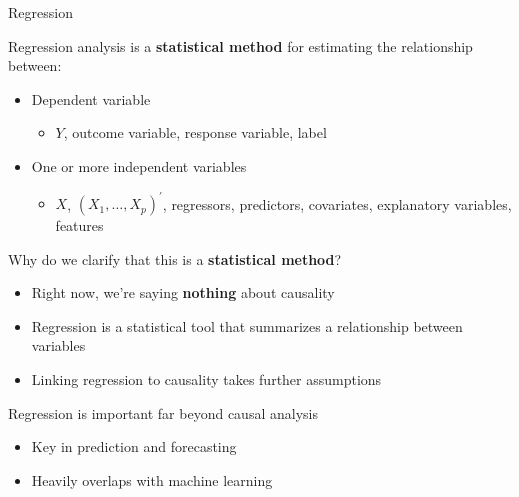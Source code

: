 \documentclass[compress, 8pt]{beamer}
\begin{document}
\begin{frame}{Regression}

    Regression analysis is a \alert<2->{\textbf{statistical method}} for estimating the relationship between:
    \begin{itemize}
        \item Dependent variable
        \begin{itemize}
            \item $Y$, outcome variable, response variable, label
        \end{itemize}
        \item One or more independent variables 
        \begin{itemize}
            \item $X$, $(X_1, \dots, X_p)^\prime$, regressors, predictors, covariates, explanatory variables, features
        \end{itemize}
    \end{itemize}

    \vspace{2ex}
    \pause
    Why do we clarify that this is a \alert<2->{\textbf{statistical method}}?
    \begin{itemize}
        \item Right now, we're saying \textbf{nothing} about causality
        \item Regression is a statistical tool that summarizes a relationship between variables
        \item Linking regression to causality takes further assumptions 
    \end{itemize}

    \vspace{2ex}
    Regression is important far beyond causal analysis
    \begin{itemize}
        \item Key in prediction and forecasting
        \item Heavily overlaps with machine learning
    \end{itemize}

\end{frame}


\end{document}
